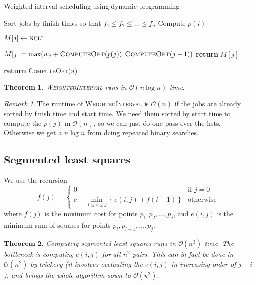 \documentclass[10pt, oneside, reqno]{amsart}
\theoremstyle{plain}%
\newtheorem{thm}{Theorem}[section]
\theoremstyle{definition}
\theoremstyle{remark}
\newtheorem*{rem}{Remark}
\newcommand{\bigo}[1]{\mathcal{O}(#1)}
\begin{document}
\begin{algorithm}[H]
	\label{alg:dynamic_rising_trend}
	\caption{Weighted interval scheduling using dynamic programming}
	\begin{algorithmic}[1]
			\State Sort jobs by finish times so that $f_1 \leq f_2 \leq \dots \leq f_n$
			\State Compute $p(i)$ 
			\EndFor
			
			\State
			
				\State $M[j] \gets \textsc{null}$
			\EndFor	
				
				\State $M[j] = \max(w_j + \textsc{ComputeOpt}(p(j)), \textsc{ComputeOpt}(j-1))$
			\EndIf
			\State \textbf{return} $M[j]$
			\EndProcedure
			
		\State \textbf{return} \textsc{ComputeOpt}($n$)
		\EndProcedure
	\end{algorithmic}
\end{algorithm}


\begin{thm}
	\textsc{WeightedInterval} runs in $\bigo{n \log n}$ time.
\end{thm}

\begin{rem}
The runtime of \textsc{WeightedInterval} is $\bigo{n}$ if the jobs are already sorted by finish time and start time. We need them sorted by start time to compute the $p(j)$ in $\bigo{n}$, so we can just do one pass over the lists. Otherwise we get a $n \log n$ from doing repeated binary searches.
\end{rem}


\subsection{Segmented least squares} %
\label{sub:segmented_least_squres}

We use the recursion 
\[
	f(j) = \begin{cases}
		0 &\text{if $j = 0$} \\
	\displaystyle c + \min_{1 \leq i \leq j} \left\{ e(i,j) + f(i-1)\right\} &\text{otherwise}			\end{cases}
\] where $f(j)$ is the minimum cost for points $p_1, p_2, \dots, p_j$, and $e(i,j)$ is the minimum sum of squares for points $p_i, p_{i+1},\dots, p_j$.

\begin{thm}
	Computing segmented least squares runs in $\bigo{n^3}$ time.  The bottleneck is computing $e(i,j)$ for all $n^2$ pairs. This can in fact be done in $\bigo{n^2}$ by trickery (it involves evaluating the $e(i,j)$ in increasing order of $j - i$), and brings the whole algorithm down to $\bigo{n^2}$.
\end{thm}
\end{document}
